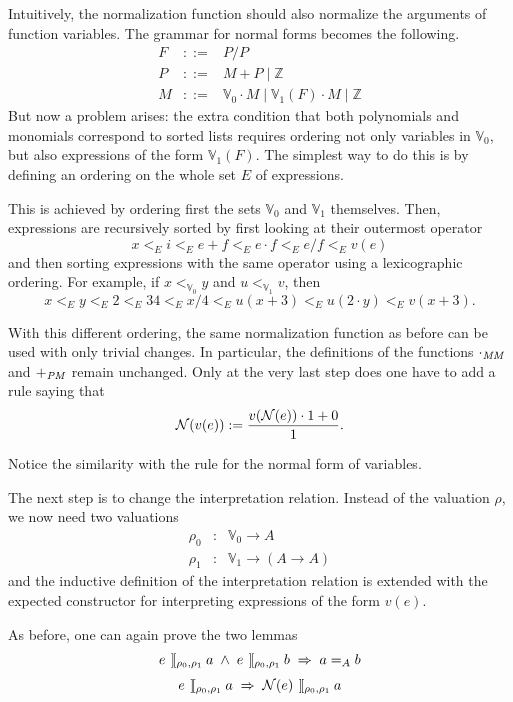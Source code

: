 \documentclass[runningheads]{llncs}
\newcommand{\intII}{\,]\![}
\newcommand{\intreltwo}{\mathbin{\intII_{\rho_0,\rho_1}}}
\newcommand{\N}{{\cal N}}
\newcommand{\alt}{\mathrel{|}}
\newcommand{\Z}{{\mathbb Z}}
\newcommand{\V}{{\mathbb V}}
\begin{document}
\noindent Intuitively, the normalization function should also normalize
the arguments of function variables.
The grammar for normal forms becomes the following.
\begin{eqnarray*}
F &::=& P/P \\
P &::=& M + P \alt \Z \\
M &::=& \V_0 \cdot M \alt \V_1(F) \cdot M \alt \Z
\end{eqnarray*}
But now a problem arises: the extra condition that both polynomials and
monomials correspond to sorted lists requires ordering not only variables
in $\V_0$, but also expressions of the form $\V_1(F)$.
The simplest way to do this is by defining an ordering on the whole set $E$
of expressions.

This is achieved by ordering first the sets $\V_0$ and $\V_1$ themselves.
Then, expressions are recursively sorted by first looking at their outermost
operator $$x <_E i <_E e+f <_E e\cdot f <_E e/f <_E v(e)$$
and then sorting expressions with the same operator using a 
lexicographic ordering.
For example, if $x<_{\V_0}y$ and $u<_{\V_1}v$, then
$$x<_E y<_E 2<_E 34<_E x/4<_E u(x+3)<_E u(2\cdot y)<_E v(x+3).$$

\noindent With this different ordering, the same normalization function
as before can be used with only trivial changes.
In particular, the definitions of the functions $\cdot_{\it MM}$ and
$+_{\it PM}$ remain unchanged.
Only at the very last step does one have to add a rule saying that
$$\N(v(e)) := {v(\N(e))\cdot 1+0\over 1}.$$

\noindent Notice the similarity with the rule for the normal form of
variables.

The next step is to change the interpretation relation.
Instead of the valuation $\rho$, we now need two valuations
\begin{eqnarray*}
\rho_0 & : & \V_0\to A\\
\rho_1 & : & \V_1\to(A\to A)
\end{eqnarray*}
\noindent and the inductive definition of the interpretation relation
is extended with the expected constructor for interpreting expressions
of the form $v(e)$.

As before, one can again prove the two lemmas
\[
\begin{array}{c}
e \intreltwo a \;\land\; e \intreltwo b \;\Rightarrow\; a =_A b\\
\noalign{\medskip}
e \intreltwo a \;\Rightarrow\; \N(e) \intreltwo a
\end{array}
\]
\end{document}
